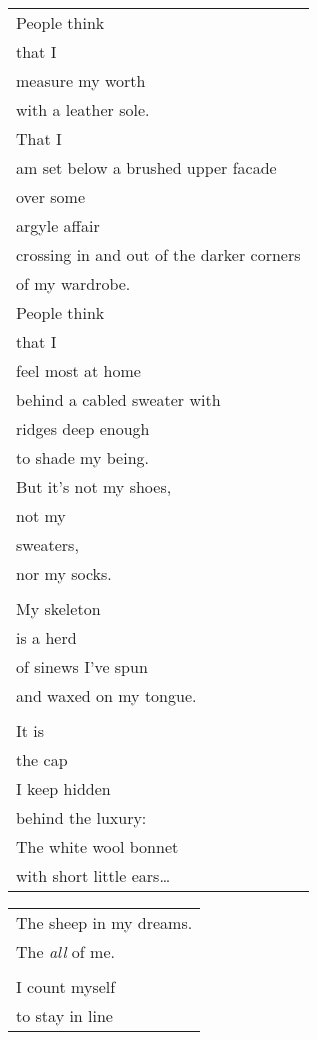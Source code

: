 \documentclass{article}
\begin{document}
\begin{center}
\begin{tabular}{l}
People think \\
that I \\
measure my worth \\
with a leather sole. \\
That I \\
am set below a brushed upper facade \\
over some \\
argyle affair \\
crossing in and out of the darker corners \\
of my wardrobe. \\
People think \\
that I \\
feel most at home \\
behind a cabled sweater with \\
ridges deep enough \\
to shade my being. \\
But it's not my shoes, \\
not my \\
sweaters, \\
nor my socks. \\
\\
My skeleton \\
is a herd \\
of sinews I've spun \\
and waxed on my tongue. \\
\\
It is \\
the cap \\
I keep hidden \\
behind the luxury: \\
The white wool bonnet \\
with short little ears\ldots{} \\
\end{tabular}
\begin{tabular}{l}
The sheep in my dreams. \\
The \textit{all} of me. \\
\\
I count myself \\
to stay in line \\

\end{tabular}
\end{center}
\end{document}
